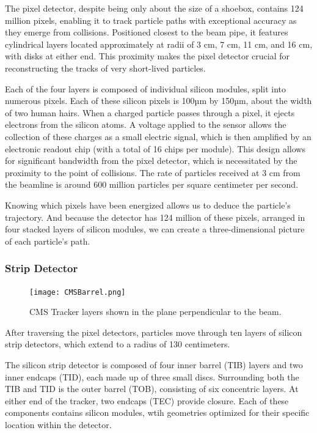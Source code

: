 The pixel detector, despite being only about the size of a shoebox, contains 124 million pixels, enabling it to track particle paths with exceptional accuracy as they emerge from collisions. 
Positioned closest to the beam pipe, it features cylindrical layers located approximately at radii of 3 cm, 7 cm, 11 cm, and 16 cm, with disks at either end. 
This proximity makes the pixel detector crucial for reconstructing the tracks of very short-lived particles.

Each of the four layers is composed of individual silicon modules, split into numerous pixels. Each of these silicon pixels is 100µm by 150µm, about the width of two human hairs. 
When a charged particle passes through a pixel, it ejects electrons from the silicon atoms. A voltage applied to the sensor allows the collection of these charges as a small electric signal, which is then amplified by an electronic readout chip (with a total of 16 chips per module). This design allows for significant bandwidth from the pixel detector, which is necessitated by the proximity to the point of collisions. The rate of particles received at 3 cm from the beamline is around 600 million particles per square centimeter per second.

Knowing which pixels have been energized allows us to deduce the particle's trajectory. And because the detector has 124 million of these pixels, arranged in four stacked layers of silicon modules, we can create a three-dimensional picture of each particle's path.


\subsubsection{Strip Detector}

\begin{figure}[!ht]
    \begin{center}
        \texttt{[image: CMSBarrel.png]}
        \caption{CMS Tracker layers shown in the plane perpendicular to the beam.}
        \label{fig:CMSBarrel}
    \end{center}
\end{figure}

After traversing the pixel detectors, particles move through ten layers of silicon strip detectors, which extend to a radius of 130 centimeters.

The silicon strip detector is composed of four inner barrel (TIB) layers and two inner endcaps (TID), each made up of three small discs. Surrounding both the TIB and TID is the outer barrel (TOB), consisting of six concentric layers. At either end of the tracker, two endcaps (TEC) provide closure. Each of these components contains silicon modules, wtih geometries optimized for their specific location within the detector.

